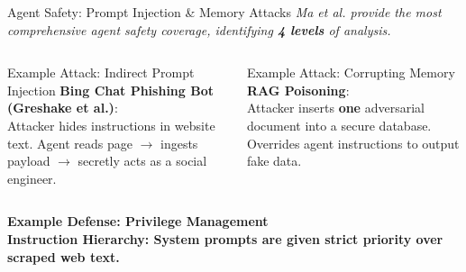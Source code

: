 \begin{frame}{Agent Safety: Prompt Injection \& Memory Attacks}
  {\footnotesize\itshape Ma et al. provide the most comprehensive
    agent safety coverage, identifying \textbf{4 levels} of analysis.}
  \vspace{0.3em}

  \begin{columns}[T]
    \begin{ucrcard}[UCRnavy]{Example Attack: Indirect Prompt Injection}
      \scriptsize
      \textbf{Bing Chat Phishing Bot (Greshake et al.)}:\\
      Attacker hides instructions in website text. Agent reads page $\to$ ingests payload $\to$ secretly acts as a social engineer.
    \end{ucrcard}

    \begin{ucrcard}[UCRnavy]{Example Attack: Corrupting Memory}
      \scriptsize
      \textbf{RAG Poisoning}:\\
      Attacker inserts \textbf{one} adversarial document into a secure database. Overrides agent instructions to output fake data.
    \end{ucrcard}
  \end{columns}
  
  \vspace{0.3em}
  \begin{ucrinfo}
    \centering\scriptsize\bfseries Example Defense: Privilege Management\\[2pt]
    \normalfont\scriptsize
    \textbf{Instruction Hierarchy}: System prompts are given strict priority over scraped web text.
  \end{ucrinfo}
\end{frame}


